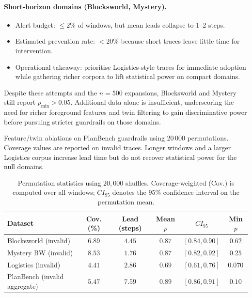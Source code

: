 \documentclass[11pt]{article}
\begin{document}
\paragraph{Short-horizon domains (Blocksworld, Mystery).}
\begin{itemize}
  \item Alert budget: $\leq 2\%$ of windows, but mean leads collapse to 1--2 steps.
  \item Estimated prevention rate: $<20\%$ because short traces leave little time for intervention.
  \item Operational takeaway: prioritise Logistics-style traces for immediate adoption while gathering richer corpora to lift statistical power on compact domains.
\end{itemize}

Despite these attempts and the $n=500$ expansions, Blocksworld and Mystery still report $p_{\min} > 0.05$.
Additional data alone is insufficient, underscoring the need for richer
foreground features and twin filtering to gain discriminative power before
pursuing stricter guardrails on those domains.

\begin{table}[t]
  \centering
  \caption{Feature/twin ablations on PlanBench guardrails using 20\,000 permutations. Coverage values are reported on invalid traces. Longer windows and a larger Logistics corpus increase lead time but do not recover statistical power for the null domains.}
  \label{tab:feature-ablation}
  
\end{table}

\begin{table}[h]
  \centering
  \caption{Permutation statistics using $20{,}000$ shuffles. Coverage-weighted (Cov.) is computed over all windows; $CI_{95}$ denotes the $95\%$ confidence interval on the permutation mean.}
  \label{tab:permutation}
  \begin{tabular}{lccccc}
    \toprule
    Dataset & Cov. (\%) & Lead (steps) & Mean $p$ & $CI_{95}$ & Min $p$ \\
    \midrule
    Blocksworld (invalid) & $6.89$ & $4.45$ & $0.87$ & $[0.84, 0.90]$ & $0.62$ \\
    Mystery BW (invalid) & $8.53$ & $1.76$ & $0.87$ & $[0.82, 0.92]$ & $0.25$ \\
    Logistics (invalid) & $4.41$ & $2.86$ & $0.69$ & $[0.61, 0.76]$ & $0.070$ \\
    PlanBench (invalid aggregate) & $5.47$ & $7.59$ & $0.89$ & $[0.86, 0.91]$ & $0.10$ \\
    \bottomrule
  \end{tabular}
\end{table}
\end{document}
